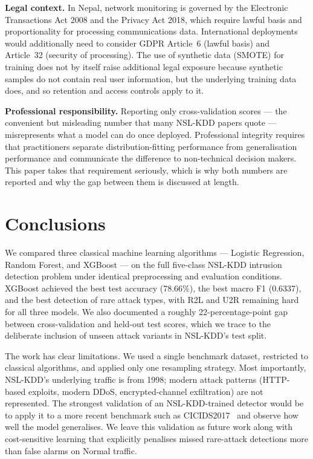 \documentclass[conference, twocolumn]{IEEEtran}
\begin{document}
\textbf{Legal context.} In Nepal, network monitoring is governed by the Electronic Transactions Act 2008 and the Privacy Act 2018, which require lawful basis and proportionality for processing communications data. International deployments would additionally need to consider GDPR Article~6 (lawful basis) and Article~32 (security of processing). The use of synthetic data (SMOTE) for training does not by itself raise additional legal exposure because synthetic samples do not contain real user information, but the underlying training data does, and so retention and access controls apply to it.

\textbf{Professional responsibility.} Reporting only cross-validation scores --- the convenient but misleading number that many NSL-KDD papers quote --- misrepresents what a model can do once deployed. Professional integrity requires that practitioners separate distribution-fitting performance from generalisation performance and communicate the difference to non-technical decision makers. This paper takes that requirement seriously, which is why both numbers are reported and why the gap between them is discussed at length.

\section{Conclusions}

We compared three classical machine learning algorithms --- Logistic Regression, Random Forest, and XGBoost --- on the full five-class NSL-KDD intrusion detection problem under identical preprocessing and evaluation conditions. XGBoost achieved the best test accuracy (78.66\%), the best macro F1 (0.6337), and the best detection of rare attack types, with R2L and U2R remaining hard for all three models. We also documented a roughly 22-percentage-point gap between cross-validation and held-out test scores, which we trace to the deliberate inclusion of unseen attack variants in NSL-KDD's test split.

The work has clear limitations. We used a single benchmark dataset, restricted to classical algorithms, and applied only one resampling strategy. Most importantly, NSL-KDD's underlying traffic is from 1998; modern attack patterns (HTTP-based exploits, modern DDoS, encrypted-channel exfiltration) are not represented. The strongest validation of an NSL-KDD-trained detector would be to apply it to a more recent benchmark such as CICIDS2017~\cite{panigrahi2018} and observe how well the model generalises. We leave this validation as future work along with cost-sensitive learning that explicitly penalises missed rare-attack detections more than false alarms on Normal traffic.
\end{document}
